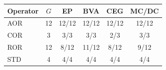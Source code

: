 \begin{center}
\begingroup\small
\begin{tabular}{@{}lccccc@{}}
\toprule
Operator & $G$ & EP & BVA & CEG & MC/DC \\
\midrule
AOR & 12 & 12/12 & 12/12 & 12/12 & 12/12 \\
COR & 3 & 3/3 & 3/3 & 2/3 & 3/3 \\
ROR & 12 & 8/12 & 11/12 & 8/12 & 9/12 \\
STD & 4 & 4/4 & 4/4 & 4/4 & 4/4 \\
\bottomrule
\end{tabular}
\endgroup
\end{center}
